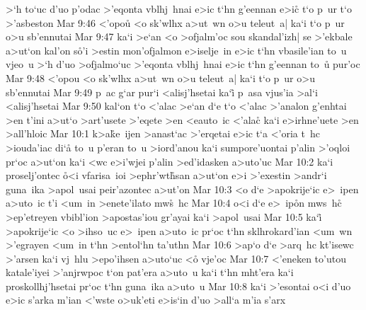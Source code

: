 >`h
to`uc
d'uo
p'odac
>'eqonta
vblhj~hnai
e>ic
t`hn
g'eennan
e>ic\r{}
t`o
p~ur
t`o
>'asbeston\bibvsend
\vs Mar 9:46
<'opou\r{}
<o
sk'wlhx
a>ut~wn
o>u
teleut~a|
ka`i
t`o
p~ur
o>u
sb'ennutai\bibvsend
\vs Mar 9:47
ka`i
>e`an
<o
>ofjalm'oc
sou
skandal'izh|
se
>'ekbale
a>ut`on
kal'on
s\r{o}'i
>estin
mon'ofjalmon
e>iselje~in
e>ic
t`hn
vbasile'ian
to~u
vjeo~u
>`h
d'uo
>ofjalmo`uc
>'eqonta
vblhj~hnai
e>ic
t`hn
g'eennan
to~u\r{}
pur'oc\bibvsend
\vs Mar 9:48
<'opou
<o
sk'wlhx
a>ut~wn
o>u
teleut~a|
ka`i
t`o
p~ur
o>u
sb'ennutai\bibvsend
\vs Mar 9:49
p~ac
g`ar
pur`i
<alisj'hsetai
ka`i\r{}
p~asa
vjus'ia
>al`i
<alisj'hsetai\bibvsend
\vs Mar 9:50
kal`on
t`o
<'alac
>e`an
d`e
t`o
<'alac
>'analon
g'enhtai
>en
t'ini
a>ut`o
>art'usete
>'eqete
>en
<eauto~ic
<'ala\r{c}
ka`i
e>irhne'uete
>en
>all'hloic\bibvsend
\vs Mar 10:1
k>a\r{k}e~ijen
>anast`ac
>'erqetai
e>ic
t`a
<'oria
t~hc
>iouda'iac
di`a\r{}
to~u
p'eran
to~u
>iord'anou
ka`i
sumpore'uontai
p'alin
>'oqloi
pr`oc
a>ut`on
ka`i
<wc
e>i'wjei
p'alin
>ed'idasken
a>uto'uc\bibvsend
\vs Mar 10:2
ka`i
proselj'ontec
\r{o}<i
vfarisa~ioi
>ephr'wt\r{h}san
a>ut`on
e>i
>'exestin
>andr`i
guna~ika
>apol~usai
peir'azontec
a>ut'on\bibvsend
\vs Mar 10:3
<o
d`e
>apokrije`ic
e>~ipen
a>uto~ic
t'i
<um~in
>enete'ilato
mw\r{s}~hc\bibvsend
{}
\vs Mar 10:4
o<i
d`e
e>~ip\r{o}n
mws~hc\r{}
>ep'etreyen
vbibl'ion
>apostas'iou
gr'ayai
ka`i
>apol~usai\bibvsend
\vs Mar 10:5
ka`i\r{}
>apokrije`ic
<o
>ihso~uc
e>~ipen
a>uto~ic
pr`oc
t`hn
sklhrokard'ian
<um~wn
>'egrayen
<um~in
t`hn
>entol`hn
ta'uthn\bibvsend
\vs Mar 10:6
>ap`o
d`e
>arq~hc
kt'isewc
>'arsen
ka`i
vj~hlu
>epo'ihsen
a>uto`uc
<o\r{}
vje'oc\bibvsend
\vs Mar 10:7
<'eneken
to'utou
katale'iyei
>'anjrwpoc
t`on
pat'era
a>uto~u
ka`i
t`hn
mht'era
ka`i
proskollhj'hsetai
pr`oc
t`hn
guna~ika
a>uto~u\bibvsend
\vs Mar 10:8
ka`i
>'esontai
o<i
d'uo
e>ic
s'arka
m'ian
<'wste
o>uk'eti
e>is`in
d'uo
>all`a
m'ia
s'arx\bibvsend
